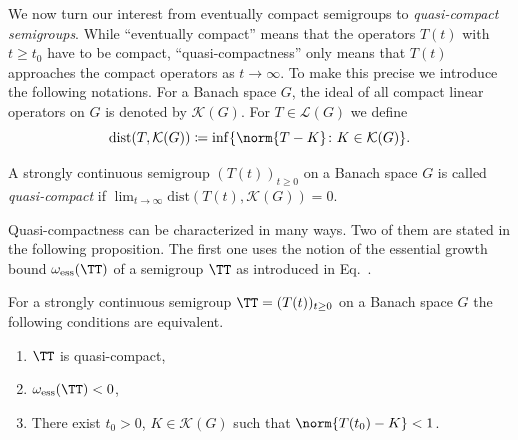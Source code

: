 We now turn our interest from eventually compact semigroups to \emph{quasi-compact semigroups}.
While \enquote{eventually compact} means that the operators $T(t)$ with $t \geq t_{0}$ have to be compact, \enquote{quasi-compactness} only
means that $T(t)$ approaches the compact operators as $t \to \infty$.
To make this precise we introduce the following notations.
For a Banach space $G$, the ideal of all compact linear operators on $G$ is denoted by $\mathcal{K}(G)$.
For $T \in \mathcal{L}(G)$ we define
%
\[
	\text{dist}(T,\mathcal{K}(G))  \coloneq  \inf\{\norm{T - K} \colon K \in \mathcal{K}(G)\} .
\]
\begin{definition}\label{def:b4-2.7}
	A strongly continuous semigroup $(T(t))_{t \geq 0}$ on a Banach
	space $G$ is called \emph{quasi-compact} if\/ $\lim_{t\to\infty}\text{dist}(T(t),\mathcal{K}(G)) = 0$.
\end{definition}
Quasi-compactness can be characterized in many ways.
Two of them are stated in the following proposition.
The first one uses the notion of the essential growth bound $\omega_{\text{ess}}(\TT)$ of a semigroup $\TT$ as introduced in Eq.~. 
\begin{proposition}\label{prop:b4-2.8}
	For a strongly continuous semigroup $\TT = (T(t))_{t \geq 0}$
	on a Banach space $G$ the following conditions are equivalent.
	\begin{enumerate}[\upshape (a)]
		\item
		$\TT$ is quasi-compact,
	
		\item 
		$\omega_{\text{ess}}(\TT) < 0$,
	
		\item 
		There exist $t_{0} > 0$, $K \in \mathcal{K}(G)$ such that $\norm{T(t_{0}) - K} < 1$.
	\end{enumerate}
\end{proposition}
